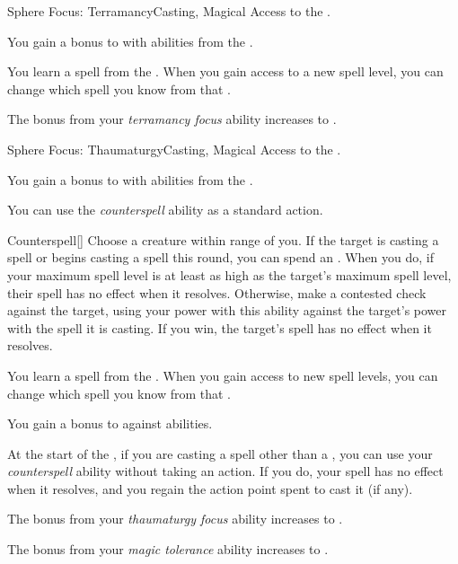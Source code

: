     \begin{feat}{Sphere Focus: Terramancy}{Casting, Magical}
        \featpre Access to the  .

         You gain a  bonus to  with abilities from the  .

         You learn a spell from the  .
        When you gain access to a new spell level, you can change which spell you know from that .

         The bonus from your \textit{terramancy focus} ability increases to .
    \end{feat}

    \begin{feat}{Sphere Focus: Thaumaturgy}{Casting, Magical}
        \featpre Access to the  .

         You gain a  bonus to  with abilities from the  .

         You can use the \textit{counterspell} ability as a standard action.
        \begin{freeability}{Counterspell}[]
            Choose a creature within \rngmed range of you.
            If the target is casting a spell or begins casting a spell this round, you can spend an .
            When you do, if your maximum spell level is at least as high as the target's maximum spell level, their spell has no effect when it resolves.
            Otherwise, make a contested  check against the target, using your power with this ability against the target's power with the spell it is casting.
            If you win, the target's spell has no effect when it resolves.
        \end{freeability}

         You learn a spell from the  .
        When you gain access to new spell levels, you can change which spell you know from that .

         You gain a  bonus to  against  abilities.

         At the start of the , if you are casting a spell other than a , you can use your \textit{counterspell} ability without taking an action.
        If you do, your spell has no effect when it resolves, and you regain the action point spent to cast it (if any).

         The bonus from your \textit{thaumaturgy focus} ability increases to .

         The bonus from your \textit{magic tolerance} ability increases to .
    \end{feat}

